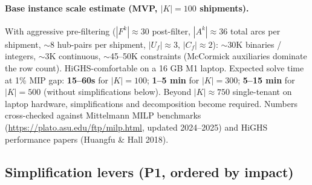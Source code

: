 \documentclass[11pt,a4paper]{article}
\theoremstyle{definition}
\begin{document}
\paragraph{Base instance scale estimate (MVP, \(|K|=100\) shipments).}
With aggressive pre-filtering ($|F^k| \approx 30$ post-filter, $|A^k| \approx 36$
total arcs per shipment, $\sim$8 hub-pairs per shipment, $|U_f| \approx 3$,
$|C_f| \approx 2$): $\sim$30K binaries / integers, $\sim$3K continuous,
$\sim$45--50K constraints (McCormick auxiliaries dominate the row count). HiGHS-comfortable on
a 16 GB M1 laptop. Expected solve time at 1\% MIP gap: \textbf{15--60s} for $|K|=100$;
\textbf{1--5 min} for $|K|=300$; \textbf{5--15 min} for $|K|=500$ (without simplifications
below). Beyond $|K| \approx 750$ single-tenant on laptop hardware, simplifications and
decomposition become required. Numbers cross-checked against Mittelmann MILP benchmarks
(\url{https://plato.asu.edu/ftp/milp.html}, updated 2024--2025) and HiGHS performance
papers (Huangfu \& Hall 2018).

\subsection*{Simplification levers (P1, ordered by impact)}
\end{document}
